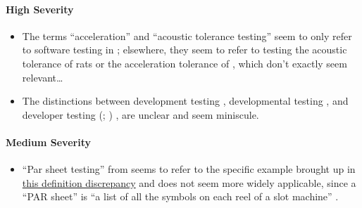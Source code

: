 \ifnotpaper\paragraph{High Severity}\fi
\begin{itemize}
      \ifnotpaper
      \item %
            The terms ``acceleration'' and ``acoustic tolerance testing'' seem
            to only refer to software testing in \citep[p.~56]{Firesmith2015};
            elsewhere, they seem to refer to testing the acoustic tolerance of
            rats \citep{HolleyEtAl1996} or the acceleration tolerance of
            \accelTolTest{}, which don't exactly seem relevant\dots\fi
      \item %
            The distinctions between development testing \citep[p.~136]{IEEE2017},
            developmental testing \citep[p.~30]{Firesmith2015}, and developer
            testing
            \ifnotpaper
                  (\citealp[p.~39]{Firesmith2015}; \citealp[p.~11]{Gerrard2000a})
            \else
                  \cite[p.~39]{Firesmith2015}, \cite[p.~11]{Gerrard2000a}
            \fi are unclear and seem miniscule.
            \ifnotpaper
\end{itemize}

\paragraph{Medium Severity}
\begin{itemize}
      \item %
            ``Par sheet testing'' from \citepISTQB{} seems to refer to the
            specific example brought up in \hyperref[specificISTQB]
            {this definition discrepancy} and does not seem more widely
            applicable, since a ``PAR sheet'' is ``a list of all the symbols
            on each reel of a slot machine'' \citep{Bluejay2024}.
\end{itemize}

